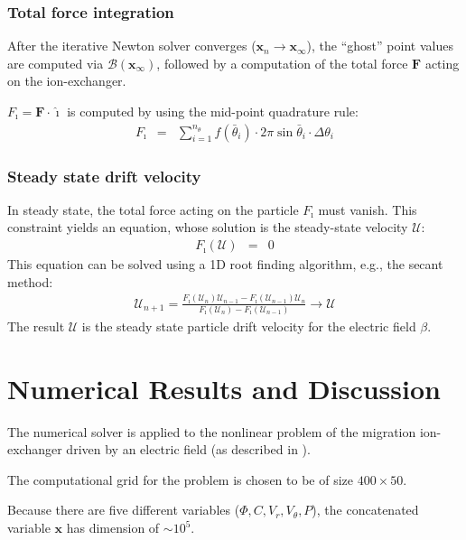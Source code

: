 \documentclass[final]{elsarticle}
\newcommand\bF{\boldsymbol{F}}
\newcommand\bx{\boldsymbol{x}}
\newcommand\cB{\mathcal{B}}
\newcommand\cU{\mathscr{U}}
\newcommand\ui{\boldsymbol{\hat{\imath}}}
\begin{document}
\subsubsection{Total force integration}
After the iterative Newton solver converges ($\bx_n \rightarrow \bx_\infty$), 
the ``ghost'' point values are computed via $\cB(\bx_\infty)$,
followed by a computation of the total force $\bF$ acting on the ion-exchanger.

$F_\imath = \bF \cdot \ui$ is computed by using the mid-point quadrature rule:
\begin{eqnarray*}
F_\imath &=& \sum_{i=1}^{n_\theta} f(\bar\theta_i) \cdot 
              2 \pi \sin\bar\theta_i \cdot \Delta\theta_i
\end{eqnarray*}

\subsubsection{Steady state drift velocity}
In steady state, the total force acting on the particle $F_\imath$ must vanish.
This constraint yields an equation, whose solution is the steady-state velocity $\cU$:
\begin{eqnarray*}
F_\imath(\cU) &=& 0
\end{eqnarray*}
This equation can be solved using a 1D root finding algorithm, e.g., the secant method:
\begin{eqnarray*}
\cU_{n+1} = \frac{F_\imath(\cU_{n})\cU_{n-1} - F_\imath(\cU_{n-1})\cU_{n}}
{F_\imath(\cU_{n}) - F_\imath(\cU_{n-1})} \rightarrow \cU
\end{eqnarray*}
The result $\cU$ is the 
steady state particle drift velocity for the electric field $\beta$.

\section{Numerical Results and Discussion} \label{sec:results}
The numerical solver is applied to the nonlinear problem of the migration ion-exchanger
driven by an electric field (as described in \cite{yariv2010migration}). 

The computational grid for the problem is chosen to be of size $400 \times 50$.

Because there are five different variables ($\varPhi, C, V_r, V_\theta, P$), the concatenated
variable $\bx$ has dimension of $\sim 10^5$.
\end{document}
